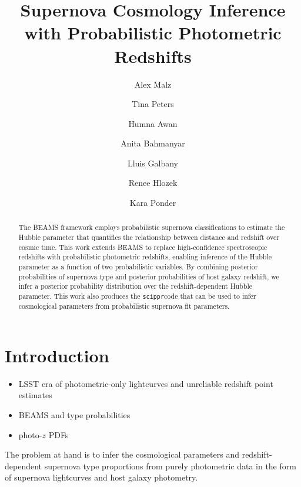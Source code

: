 \documentclass[12pt, onecolumn]{emulateapj}
\newcommand{\scippr}{\texttt{scippr}}
\begin{document}
\title{Supernova Cosmology Inference with Probabilistic Photometric Redshifts}

\author{Alex Malz}
\author{Tina Peters}
\author{Humna Awan}
\author{Anita Bahmanyar}
\author{Lluis Galbany}
\author{Renee Hlozek}
\author{Kara Ponder}

\begin{abstract}
The BEAMS framework employs probabilistic supernova classifications to estimate the Hubble parameter that quantifies the relationship between distance and redshift over cosmic time.  This work extends BEAMS to replace high-confidence spectroscopic redshifts with probabilistic photometric redshifts, enabling inference of the Hubble parameter as a function of two probabilistic variables.  By combining posterior probabilities of supernova type and posterior probabilities of host galaxy redshift, we infer a posterior probability distribution over the redshift-dependent Hubble parameter.  This work also produces the \scippr code that can be used to infer cosmological parameters from probabilistic supernova fit parameters.
\end{abstract}

\keywords{}

\section{Introduction}
\label{sec:intro}

\citet{kunz_bayesian_2007, kelly_flexible_2008, hlozek_photometric_2012}

\begin{itemize}
	\item LSST era of photometric-only lightcurves and unreliable redshift point estimates
	\item BEAMS and type probabilities
	\item photo-$z$ PDFs
\end{itemize}

The problem at hand is to infer the cosmological parameters and redshift-dependent supernova type proportions from purely photometric data in the form of supernova lightcurves and host galaxy photometry.
\end{document}
